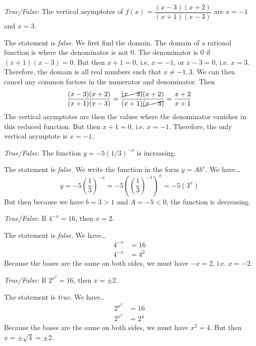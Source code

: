 \documentclass[11pt,letterpaper]{article}
\begin{document}
\quizsol \textit{True/False}: The vertical asymptotes of $f(x)= \dfrac{(x - 3)(x + 2)}{(x + 1)(x - 3)}$ are $x= -1$ and $x= 3$. \pspace 

\sol The statement is \textit{false}. We first find the domain. The domain of a rational function is where the denominator is not 0. The denominator is 0 if $(x + 1)(x - 3)= 0$. But then $x + 1= 0$, i.e. $x= -1$, or $x - 3= 0$, i.e. $x= 3$. Therefore, the domain is all real numbers such that $x \neq -1, 3$. We can then cancel any common factors in the numerator and denominator. Then
	\[
	\dfrac{(x - 3)(x + 2)}{(x + 1)(x - 3)}= \dfrac{\cancel{(x - 3)}(x + 2)}{(x + 1)\cancel{(x - 3)}}= \dfrac{x + 2}{x + 1}
	\]
The vertical asymptotes are then the values where the denominator vanishes in this reduced function. But then $x + 1= 0$, i.e. $x= -1$. Therefore, the only vertical asymptote is $x= -1$. \pvspace{1.3cm}



\quizsol \textit{True/False}: The function $y= -5(1/3)^{-x}$ is increasing.

\sol The statement is \textit{false}. We write the function in the form $y= Ab^x$. We have\dots
	\[
	y= -5 \left( \dfrac{1}{3} \right)^{-x}= -5 \left( \left( \dfrac{1}{3} \right)^{-1} \right)^x= - 5(3^x)
	\]
But then because we have $b= 3 > 1$ and $A= -5 < 0$, the function is decreasing. \pvspace{1.3cm}



\quizsol \textit{True/False}: If $4^{-x}= 16$, then $x= 2$. \pspace

\sol The statement is \textit{false}. We have\dots
	\[
	\begin{aligned}
	4^{-x}&= 16 \\
	4^{-x}&= 4^2
	\end{aligned}
	\]
Because the bases are the same on both sides, we must have $-x= 2$, i.e. $x= -2$. \pvspace{1.3cm}



\quizsol \textit{True/False}: If $2^{x^2}= 16$, then $x= \pm 2$. \pspace

\sol The statement is \textit{true}. We have\dots
	\[
	\begin{aligned}
	2^{x^2}&= 16 \\
	2^{x^2}&= 2^4
	\end{aligned}
	\]
Because the bases are the same on both sides, we must have $x^2= 4$. But then $x= \pm \sqrt{4}= \pm 2$. \pvspace{1.3cm}
\end{document}
